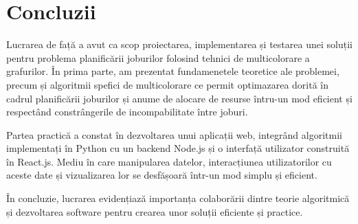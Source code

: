 \chapter*{Concluzii} 

Lucrarea de față a avut ca scop proiectarea, implementarea și testarea unei soluții pentru problema planificării joburilor folosind tehnici de multicolorare a grafurilor. În prima parte, am prezentat fundamenetele teoretice ale problemei, precum și algoritmii spefici de multicolorare ce permit optimazarea dorită în cadrul planificării joburilor și anume de alocare de resurse întru-un mod eficient și respectând constrângerile de incompabilitate între joburi.

Partea practică a constat în dezvoltarea unui aplicații web, integrând algoritmii implementați în Python cu un backend Node.js și o interfață utilizator construită în React.js. Mediu în care manipularea datelor, interacțiunea utilizatorilor cu aceste date și vizualizarea lor se desfășoară într-un mod simplu și eficient.

În concluzie, lucrarea evidențiază importanța colaborării dintre teorie algoritmică și dezvoltarea software pentru crearea unor soluții eficiente și practice. 